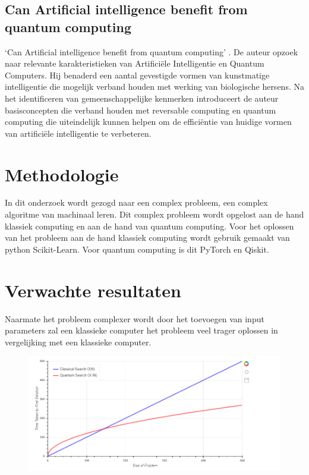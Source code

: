 \subsection{Can Artificial intelligence benefit from quantum computing}
‘Can Artificial intelligence benefit from quantum computing' \autocite{Vincente Moret-Bonillo, 2014}. De auteur opzoek naar relevante karakteristieken van Artificiële Intelligentie en Quantum Computers. Hij benaderd een aantal gevestigde vormen van kunstmatige intelligentie die mogelijk verband houden met werking van biologische hersens. Na het identificeren van gemeenschappelijke kenmerken introduceert de auteur basisconcepten die verband houden met reversable computing en quantum computing die uiteindelijk kunnen helpen om de efficiëntie van huidige vormen van artificiële intelligentie te verbeteren.



\section{Methodologie}
\label{sec:methodologie}

In dit onderzoek wordt gezogd naar een complex probleem, een complex algoritme van machinaal leren. Dit complex probleem wordt opgelost aan de hand klassiek computing en aan de hand van quantum computing. Voor het oplossen van het probleem aan de hand klassiek computing wordt gebruik gemaakt van python Scikit-Learn. Voor quantum computing is dit PyTorch en Qiskit.
\section{Verwachte resultaten}
\label{sec:verwachte_resultaten}

Naarmate het probleem complexer wordt door het toevoegen van input parameters zal een klassieke computer het probleem veel trager oplossen in vergelijking met een klassieke computer.
\begin{figure}[h]
    \includegraphics[width=\linewidth]{speed.PNG}
\end{figure}

